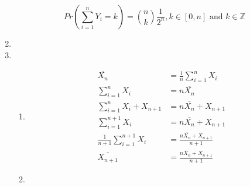\documentclass[11pt,letterpaper,titlepage]{article}
\begin{document}
\begin{enumerate}
    \begin{equation*}
        Pr(\sum_{i = 1}^{n} Y_i = k) = {n \choose k} \frac{1}{2^n}, k \in [0, n] \text{ and } k \in \mathbb{Z}
    \end{equation*}
    
    
    \item %
    
    \item %
    
    \begin{enumerate}
        \item 
        
        \begin{equation*}
            \begin{aligned}
                \overline{X_n} &= \frac{1}{n} \sum_{i = 1}^{n} X_i \\
                \sum_{i = 1}^{n} X_i &= n \overline{X_n} \\
                \sum_{i = 1}^{n} X_i + X_{n+1} &= n \overline{X_n} + X_{n+1} \\
                \sum_{i = 1}^{n+1} X_i &= n \overline{X_n} + X_{n+1} \\
                \frac{1}{n + 1} \sum_{i = 1}^{n+1} X_i &= \frac{n \overline{X_n} + X_{n+1}}{n + 1} \\
                \overline{X_{n + 1}} &= \frac{n \overline{X_n} + X_{n+1}}{n + 1}
            \end{aligned}
        \end{equation*}
        
        \item
        

\end{enumerate}
\end{enumerate}
\end{document}
